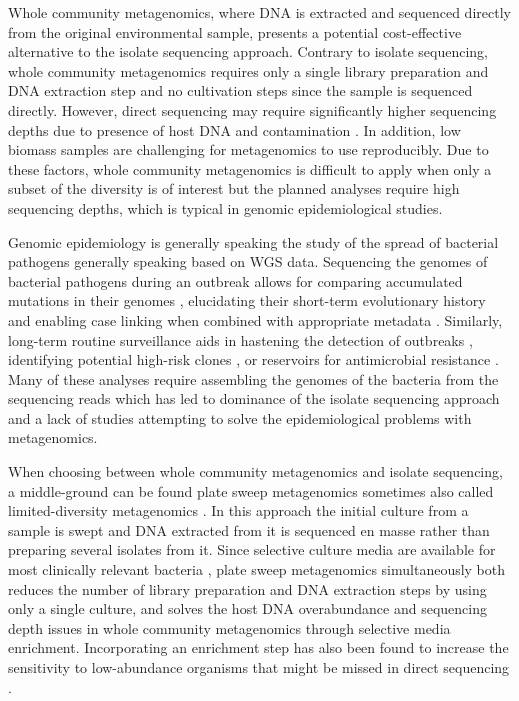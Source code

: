 \documentclass[officiallayout]{tktla}
\begin{document}
Whole community metagenomics, where DNA is extracted and
sequenced directly from the original environmental sample, presents a
potential cost-effective alternative to the isolate sequencing
approach. Contrary to isolate sequencing, whole community metagenomics requires
only a single library preparation and DNA extraction step and no
cultivation steps since the sample is sequenced directly. However,
direct sequencing may require significantly higher sequencing depths
due to presence of host DNA \citep{pereira2019impact,
  mcardle2020sensitivity} and contamination
\citep{mcardle2020sensitivity, salter2014reagent}. In addition, low
biomass samples are challenging for metagenomics to use
reproducibly. Due to these factors, whole community metagenomics is difficult
to apply when only a subset of the diversity is of interest but the
planned analyses require high sequencing depths, which is
typical in genomic epidemiological studies.

Genomic epidemiology is generally speaking the study of the spread of
bacterial pathogens generally speaking based on WGS data. Sequencing
the genomes of bacterial pathogens during an outbreak allows for
comparing accumulated mutations in their genomes
\citep{tang2017infection}, elucidating their short-term evolutionary
history and enabling case linking when combined with appropriate
metadata \citep{grad2014epidemiologic, hill2021progress}. Similarly,
long-term routine surveillance aids in hastening the detection of
outbreaks \citep{eyre2012pilot, gardy2018towards}, identifying
potential high-risk clones \citep{aanensen2016whole}, or reservoirs
for antimicrobial resistance \citep{weingarten2018genomic,
  coipan2020genomic}. Many of these analyses require assembling the
genomes of the bacteria from the sequencing reads which has led to
dominance of the isolate sequencing approach and a lack of studies
attempting to solve the epidemiological problems with metagenomics.

When choosing between whole community metagenomics and isolate sequencing, a
middle-ground can be found plate sweep metagenomics
\cite{maklin_high-resolution_2021} \textemdash{ } sometimes also
called limited-diversity metagenomics \citep{cocker_drivers_2022}. In
this approach the initial culture from a sample is swept and DNA
extracted from it is sequenced en masse rather than preparing several
isolates from it. Since selective culture media are available for most
clinically relevant bacteria \citep{lagier2015current}, plate sweep
metagenomics simultaneously both reduces the number of library
preparation and DNA extraction steps by using only a single culture,
and solves the host DNA overabundance and sequencing depth issues in
whole community metagenomics through selective media enrichment. Incorporating an
enrichment step has also been found to increase the sensitivity to
low-abundance organisms that might be missed in direct sequencing
\citep{whelan2020culture}.
\end{document}
